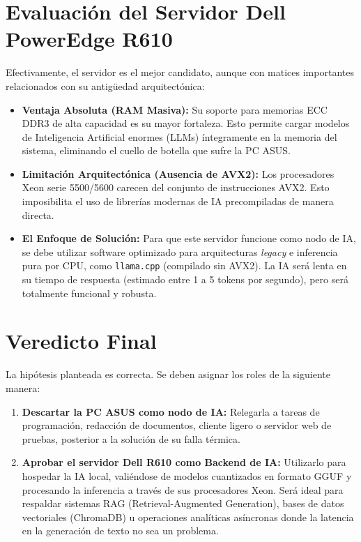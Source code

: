 \documentclass[12pt,a4paper]{article}
\begin{document}
\section{Evaluación del Servidor Dell PowerEdge R610}
Efectivamente, el servidor es el mejor candidato, aunque con matices importantes relacionados con su antigüedad arquitectónica:
\begin{itemize}
    \item \textbf{Ventaja Absoluta (RAM Masiva):} Su soporte para memorias ECC DDR3 de alta capacidad es su mayor fortaleza. Esto permite cargar modelos de Inteligencia Artificial enormes (LLMs) íntegramente en la memoria del sistema, eliminando el cuello de botella que sufre la PC ASUS.
    \item \textbf{Limitación Arquitectónica (Ausencia de AVX2):} Los procesadores Xeon serie 5500/5600 carecen del conjunto de instrucciones AVX2. Esto imposibilita el uso de librerías modernas de IA precompiladas de manera directa.
    \item \textbf{El Enfoque de Solución:} Para que este servidor funcione como nodo de IA, se debe utilizar software optimizado para arquitecturas \textit{legacy} e inferencia pura por CPU, como \texttt{llama.cpp} (compilado sin AVX2). La IA será lenta en su tiempo de respuesta (estimado entre 1 a 5 tokens por segundo), pero será totalmente funcional y robusta.
\end{itemize}

\section{Veredicto Final}
La hipótesis planteada es correcta. Se deben asignar los roles de la siguiente manera:

\begin{enumerate}
    \item \textbf{Descartar la PC ASUS como nodo de IA:} Relegarla a tareas de programación, redacción de documentos, cliente ligero o servidor web de pruebas, posterior a la solución de su falla térmica.
    \item \textbf{Aprobar el servidor Dell R610 como Backend de IA:} Utilizarlo para hospedar la IA local, valiéndose de modelos cuantizados en formato GGUF y procesando la inferencia a través de sus procesadores Xeon. Será ideal para respaldar sistemas RAG (Retrieval-Augmented Generation), bases de datos vectoriales (ChromaDB) u operaciones analíticas asíncronas donde la latencia en la generación de texto no sea un problema.
\end{enumerate}
\end{document}
